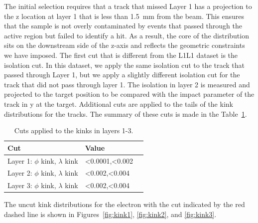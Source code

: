 \documentclass[twoside]{article}
\begin{document}
The initial selection requires that a track that missed Layer 1 has a projection to the z location at layer 1 that is less than 1.5~mm from the beam. This ensures that the sample is not overly contaminated by events that passed through the active region but failed to identify a hit. As a result, the core of the distribution sits on the downstream side of the z-axis and reflects the geometric constraints we have imposed. The first cut that is different from the L1L1 dataset is the isolation cut. In this dataset, we apply the same isolation cut to the track that passed through Layer 1, but we apply a slightly different isolation cut for the track that did not pass through layer 1. The isolation in layer 2 is measured and projected to the target position to be compared with the impact parameter of the track in y at the target. Additional cuts are applied to the tails of the kink distributions for the tracks. The summary of these cuts is made in the Table~\ref{kink_cuts}.

\begin{table}[H]
\caption{Cuts applied to the kinks in layers 1-3.}
\label{kink_cuts}
\centering
\begin{tabular}{lll}
\toprule
Cut & Value \\
\midrule
Layer 1: $\phi$ kink, $\lambda$ kink & <0.0001,<0.002\\
Layer 2: $\phi$ kink, $\lambda$ kink & <0.002,<0.004\\
Layer 3: $\phi$ kink, $\lambda$ kink & <0.002,<0.004\\
\bottomrule
\end{tabular}
\end{table}

The uncut kink distributions for the electron with the cut indicated by the red dashed line is shown in Figures~\ref{fig:kink1}, \ref{fig:kink2}, and \ref{fig:kink3}.
\end{document}
